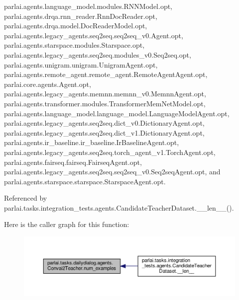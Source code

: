 parlai.\+agents.\+language\+\_\+model.\+modules.\+R\+N\+N\+Model.\+opt, parlai.\+agents.\+drqa.\+rnn\+\_\+reader.\+Rnn\+Doc\+Reader.\+opt, parlai.\+agents.\+drqa.\+model.\+Doc\+Reader\+Model.\+opt, parlai.\+agents.\+legacy\+\_\+agents.\+seq2seq.\+seq2seq\+\_\+v0.\+Agent.\+opt, parlai.\+agents.\+starspace.\+modules.\+Starspace.\+opt, parlai.\+agents.\+legacy\+\_\+agents.\+seq2seq.\+modules\+\_\+v0.\+Seq2seq.\+opt, parlai.\+agents.\+unigram.\+unigram.\+Unigram\+Agent.\+opt, parlai.\+agents.\+remote\+\_\+agent.\+remote\+\_\+agent.\+Remote\+Agent\+Agent.\+opt, parlai.\+core.\+agents.\+Agent.\+opt, parlai.\+agents.\+legacy\+\_\+agents.\+memnn.\+memnn\+\_\+v0.\+Memnn\+Agent.\+opt, parlai.\+agents.\+transformer.\+modules.\+Transformer\+Mem\+Net\+Model.\+opt, parlai.\+agents.\+language\+\_\+model.\+language\+\_\+model.\+Language\+Model\+Agent.\+opt, parlai.\+agents.\+legacy\+\_\+agents.\+seq2seq.\+dict\+\_\+v0.\+Dictionary\+Agent.\+opt, parlai.\+agents.\+legacy\+\_\+agents.\+seq2seq.\+dict\+\_\+v1.\+Dictionary\+Agent.\+opt, parlai.\+agents.\+ir\+\_\+baseline.\+ir\+\_\+baseline.\+Ir\+Baseline\+Agent.\+opt, parlai.\+agents.\+legacy\+\_\+agents.\+seq2seq.\+torch\+\_\+agent\+\_\+v1.\+Torch\+Agent.\+opt, parlai.\+agents.\+fairseq.\+fairseq.\+Fairseq\+Agent.\+opt, parlai.\+agents.\+legacy\+\_\+agents.\+seq2seq.\+seq2seq\+\_\+v0.\+Seq2seq\+Agent.\+opt, and parlai.\+agents.\+starspace.\+starspace.\+Starspace\+Agent.\+opt.



Referenced by parlai.\+tasks.\+integration\+\_\+tests.\+agents.\+Candidate\+Teacher\+Dataset.\+\_\+\+\_\+len\+\_\+\+\_\+().

Here is the caller graph for this function\+:
\nopagebreak
\begin{figure}[H]
\begin{center}
\leavevmode
\includegraphics[width=350pt]{classparlai_1_1tasks_1_1dailydialog_1_1agents_1_1Convai2Teacher_a6060e79bfc569e66d1c36af19522ed79_icgraph}
\end{center}
\end{figure}
\mbox{\label{classparlai_1_1tasks_1_1dailydialog_1_1agents_1_1Convai2Teacher_ae9ac20bbc572a14bcd71f33fb8887599}} 
